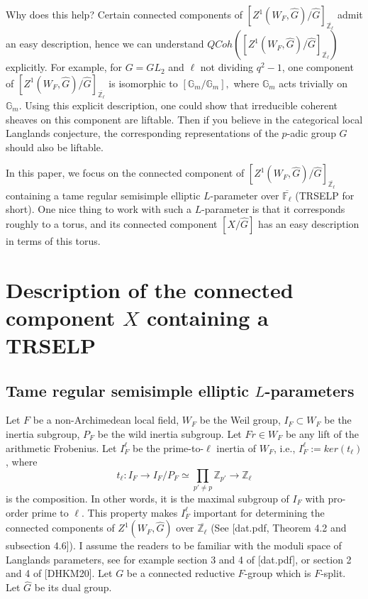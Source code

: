\documentclass{article}
\newcommand{\red}[1]{\textcolor{red}{#1}}
\begin{document}
	Why does this help? Certain connected components of $[Z^1(W_F, \hat{G})/\hat{G}]_{\overline{\mathbb{Z}_\ell}}$ admit an easy description, hence we can understand $QCoh([Z^1(W_F, \hat{G})/\hat{G}]_{\overline{\mathbb{Z}_\ell}})$ explicitly. For example, for $G=GL_2$ and $\ell$ not dividing $q^2-1$, one component of $[Z^1(W_F, \hat{G})/\hat{G}]_{\overline{\mathbb{Z}_\ell}}$ is isomorphic to $[\mathbb{G}_m/\mathbb{G}_m],$ where $\mathbb{G}_m$ acts trivially on $\mathbb{G}_m$. Using this explicit description, one could show that irreducible coherent sheaves on this component are liftable. Then if you believe in the categorical local Langlands conjecture, the corresponding representations of the $p$-adic group $G$ should also be liftable. %
	
	In this paper, we focus on the connected component of $[Z^1(W_F, \hat{G})/\hat{G}]_{\overline{\mathbb{Z}_\ell}}$ containing a tame regular semisimple elliptic $L$-parameter over $\overline{\mathbb{F}_\ell}$ (TRSELP for short).  One nice thing to work with such a $L$-parameter is that it corresponds roughly to a torus, and its connected component $[X/\hat{G}]$ has an easy description in terms of this torus.
	
	
	
	\section{Description of the connected component $X$ containing a TRSELP}
	
	\subsection{Tame regular semisimple elliptic $L$-parameters}
	
	Let $F$ be a non-Archimedean local field, $W_F$ be the Weil group, $I_F \subset W_F$ be the inertia subgroup, $P_F$ be the wild inertia subgroup. Let $Fr \in W_F$ be any lift of the arithmetic Frobenius. Let $I_F^\ell$ be the prime-to-$\ell$ inertia of $W_F$, i.e., $I_F^\ell:=ker(t_\ell)$, where 
	$$t_\ell: I_F \to I_F/P_F \simeq \prod_{p' \neq p}\mathbb{Z}_{p'} \to \mathbb{Z}_\ell$$ 
	is the composition. In other words, it is the maximal subgroup of $I_F$ with pro-order prime to $\ell$. This property makes $I_F^\ell$ important for determining the connected components of $Z^1(W_F, \hat{G})$ over $\overline{\mathbb{Z}_{\ell}}$ (See [dat.pdf, Theorem 4.2 and subsection 4.6]). I assume the readers to be familiar with the moduli space of Langlands parameters, see for example section 3 and 4 of [dat.pdf], or section 2 and 4 of [DHKM20]. Let $G$ be a connected reductive $F$-group which is $F$-split. Let $\hat{G}$ be its dual group. 
	
\end{document}
